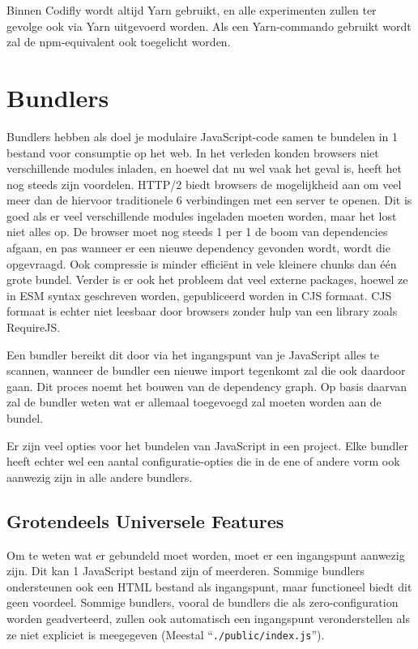 Binnen Codifly wordt altijd Yarn gebruikt, en alle experimenten zullen ter gevolge ook via Yarn uitgevoerd worden. Als een Yarn-commando gebruikt wordt zal de npm-equivalent ook toegelicht worden.

\section{Bundlers}

Bundlers hebben als doel je modulaire JavaScript-code samen te bundelen in 1 bestand voor consumptie op het web. In het verleden konden browsers niet verschillende modules inladen, en hoewel dat nu wel vaak het geval is, heeft het nog steeds zijn voordelen. HTTP/2 biedt browsers de mogelijkheid aan om veel meer dan de hiervoor traditionele 6 verbindingen met een server te openen. Dit is goed als er veel verschillende modules ingeladen moeten worden, maar het lost niet alles op. De browser moet nog steeds 1 per 1 de boom van dependencies afgaan, en pas wanneer er een nieuwe dependency gevonden wordt, wordt die opgevraagd. Ook compressie is minder efficiënt in vele kleinere chunks dan één grote bundel. \autocite{you_2021} Verder is er ook het probleem dat veel externe packages, hoewel ze in ESM syntax geschreven worden, gepubliceerd worden in CJS formaat. CJS formaat is echter niet leesbaar door browsers zonder hulp van een library zoals RequireJS. \autocite{sweeney_2020}

Een bundler bereikt dit door via het ingangspunt van je JavaScript alles te scannen, wanneer de bundler een nieuwe import tegenkomt zal die ook daardoor gaan. Dit proces noemt het bouwen van de dependency graph. Op basis daarvan zal de bundler weten wat er allemaal toegevoegd zal moeten worden aan de bundel.

Er zijn veel opties voor het bundelen van JavaScript in een project. Elke bundler heeft echter wel een aantal configuratie-opties die in de ene of andere vorm ook aanwezig zijn in alle andere bundlers.

\subsection{Grotendeels Universele Features}

Om te weten wat er gebundeld moet worden, moet er een ingangspunt aanwezig zijn. Dit kan 1 JavaScript bestand zijn of meerderen. Sommige bundlers ondersteunen ook een HTML bestand als ingangspunt, maar functioneel biedt dit geen voordeel. 
Sommige bundlers, vooral de bundlers die als zero-configuration worden geadverteerd, zullen ook automatisch een ingangspunt veronderstellen als ze niet expliciet is meegegeven (Meestal ``\lstinline{./public/index.js}'').

